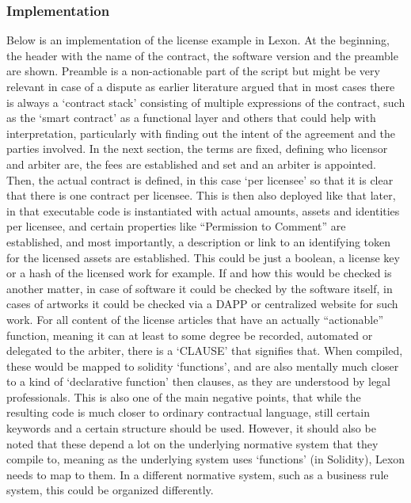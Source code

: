 \documentclass{article}
\begin{document}
\subsubsection{Implementation}
Below is an implementation of the license example in Lexon. At the beginning, the header with the name of the contract, the software version and the preamble are shown. Preamble is a non-actionable part of the script but might be very relevant in case of a dispute as earlier literature argued that in most cases there is always a ‘contract stack’ consisting of multiple expressions of the contract, such as the ‘smart contract’ as a functional layer and others that could help with interpretation, particularly with finding out the intent of the agreement and the parties involved. 
In the next section, the terms are fixed, defining who licensor and arbiter are, the fees are established and set and an arbiter is appointed. Then, the actual contract is defined, in this case ‘per licensee’ so that it is clear that there is one contract per licensee. This is then also deployed like that later, in that executable code is instantiated with actual amounts, assets and identities per licensee, and certain properties like “Permission to Comment” are established, and most importantly, a description or link to an identifying token for the licensed assets are established. This could be just a boolean, a license key or a hash of the licensed work for example. If and how this would be checked is another matter, in case of software it could be checked by the software itself, in cases of artworks it could be checked via a DAPP or centralized website for such work. For all content of the license articles that have an actually “actionable” function, meaning it can at least to some degree be recorded, automated or delegated to the arbiter, there is a ‘CLAUSE’ that signifies that. When compiled, these would be mapped to solidity ‘functions’, and are also mentally much closer to a kind of ‘declarative function’ then clauses, as they are understood by legal professionals. This is also one of the main negative points, that while the resulting code is much closer to ordinary contractual language, still certain keywords and a certain structure should be used. However, it should also be noted that these depend a lot on the underlying normative system that they compile to, meaning as the underlying system uses ‘functions’ (in Solidity), Lexon needs to map to them. In a different normative system, such as a business rule system, this could be organized differently.
\end{document}
